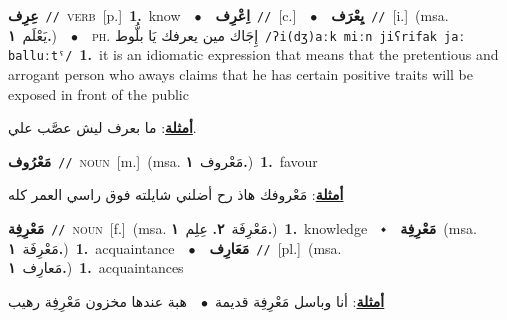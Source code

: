 \documentclass[10pt,a4paper,twoside]{article} %
\begin{document}
\begin{multicols}{2}
{\setlength\topsep{0pt}\textbf{\foreignlanguage{arabic}{عِرِف}}\ {\color{gray}\texttt{//}\color{black}}\ \textsc{verb}\ [p.]\ \textbf{1.}~know\ \ $\bullet$\ \ \setlength\topsep{0pt}\textbf{\foreignlanguage{arabic}{اِعْرِف}}\ {\color{gray}\texttt{//}\color{black}}\ [c.]\ \ $\bullet$\ \ \setlength\topsep{0pt}\textbf{\foreignlanguage{arabic}{يِعْرَف}}\ {\color{gray}\texttt{//}\color{black}}\ [i.]\ \color{gray}(msa. \foreignlanguage{arabic}{يَعْلَم}~\foreignlanguage{arabic}{\textbf{١.}})\color{black}\ \ $\bullet$\ \ \textsc{ph.} \color{gray} \foreignlanguage{arabic}{إِجَاك مين يعرفك يَا بلُّوط}\color{black}\ {\color{gray}\texttt{/{\sffamily ʔi(dʒ)aːk miːn jiʕrifak jaː balluːtˤ}/}\color{black}}\ \textbf{1.}~it is an idiomatic expression that means that the pretentious and arrogant person who aways claims that he has certain positive traits will be exposed in front of the public\  \begin{flushright}\color{gray}\foreignlanguage{arabic}{\textbf{\underline{\foreignlanguage{arabic}{أمثلة}}}: ما بعرف ليش عصَّب علي.}\end{flushright}\color{black}} \vspace{2mm}

{\setlength\topsep{0pt}\textbf{\foreignlanguage{arabic}{مَعْرُوف}}\ {\color{gray}\texttt{//}\color{black}}\ \textsc{noun}\ [m.]\ \color{gray}(msa. \foreignlanguage{arabic}{مَعْروف}~\foreignlanguage{arabic}{\textbf{١.}})\color{black}\ \textbf{1.}~favour\  \begin{flushright}\color{gray}\foreignlanguage{arabic}{\textbf{\underline{\foreignlanguage{arabic}{أمثلة}}}: مَعْروفك هاذ رح أضلني شايلته فوق راسي العمر كله}\end{flushright}\color{black}} \vspace{2mm}

{\setlength\topsep{0pt}\textbf{\foreignlanguage{arabic}{مَعْرِفِة}}\ {\color{gray}\texttt{//}\color{black}}\ \textsc{noun}\ [f.]\ \color{gray}(msa. \foreignlanguage{arabic}{مَعْرِفَة}~\foreignlanguage{arabic}{\textbf{٢.}}  \foreignlanguage{arabic}{عِلِم}~\foreignlanguage{arabic}{\textbf{١.}})\color{black}\ \textbf{1.}~knowledge\ \ $\smblkdiamond$\ \ \setlength\topsep{0pt}\textbf{\foreignlanguage{arabic}{مَعْرِفِة}}\ \color{gray}(msa. \foreignlanguage{arabic}{مَعْرِفَة}~\foreignlanguage{arabic}{\textbf{١.}})\color{black}\ \textbf{1.}~acquaintance\ \ $\bullet$\ \ \setlength\topsep{0pt}\textbf{\foreignlanguage{arabic}{مَعَارِف}}\ {\color{gray}\texttt{//}\color{black}}\ [pl.]\ \color{gray}(msa. \foreignlanguage{arabic}{مَعارِف}~\foreignlanguage{arabic}{\textbf{١.}})\color{black}\ \textbf{1.}~acquaintances\  \begin{flushright}\color{gray}\foreignlanguage{arabic}{\textbf{\underline{\foreignlanguage{arabic}{أمثلة}}}: أنا وباسل مَعْرِفِة قديمة\ $\bullet$\ \  هبة عندها مخزون مَعْرِفِة رهيب}\end{flushright}\color{black}} \vspace{2mm}


\end{multicols}
\end{document}
